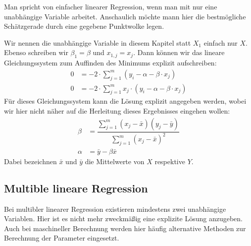 Man spricht von einfacher linearer Regression, wenn man mit nur eine unabhängige Variable arbeitet. Anschaulich möchte mann hier die bestmögliche Schätzgerade durch eine gegebene Punktwolke legen.

Wir nennen die unabhängige Variable in diesem Kapitel statt $X_1$ einfach nur $X$. Ebenso schreiben wir $\beta_1 = \beta$ und $x_{1, j} = x_j$. Dann können wir das lineare Gleichungssystem zum Auffinden des Minimums explizit aufschreiben:
\begin{align*}
    0 &= - 2 \cdot \sum_{j=1}^m (y_i - \alpha - \beta \cdot x_{j})\\
    0 &= - 2 \cdot \sum_{j=1}^m x_j \cdot (y_i - \alpha - \beta \cdot x_{j})
\end{align*}
Für dieses Gleichungssystem kann die Lösung explizit angegeben werden, wobei wir hier nicht näher auf die Herleitung dieses Ergebnisses eingehen wollen:
\begin{align*}
    \beta &= \dfrac{\sum\limits_{j=1}^m (x_j - \bar{x})(y_j - \bar{y})}{\sum\limits_{j=1}^m (x_j - \bar{x})^2}\\
    \alpha &= \bar{y} - \beta \bar{x}
\end{align*}
Dabei bezeichnen $\bar{x}$ und $\bar{y}$ die Mittelwerte von $X$ respektive $Y$.

\subsection{Multible lineare Regression}

Bei multibler linearer Regression existieren mindestens zwei unabhängige Variablen. Hier ist es nicht mehr zweckmäßig eine explizite Lösung anzugeben. Auch bei maschineller Berechnung werden hier häufig alternative Methoden zur Berechnung der Parameter eingesetzt.
